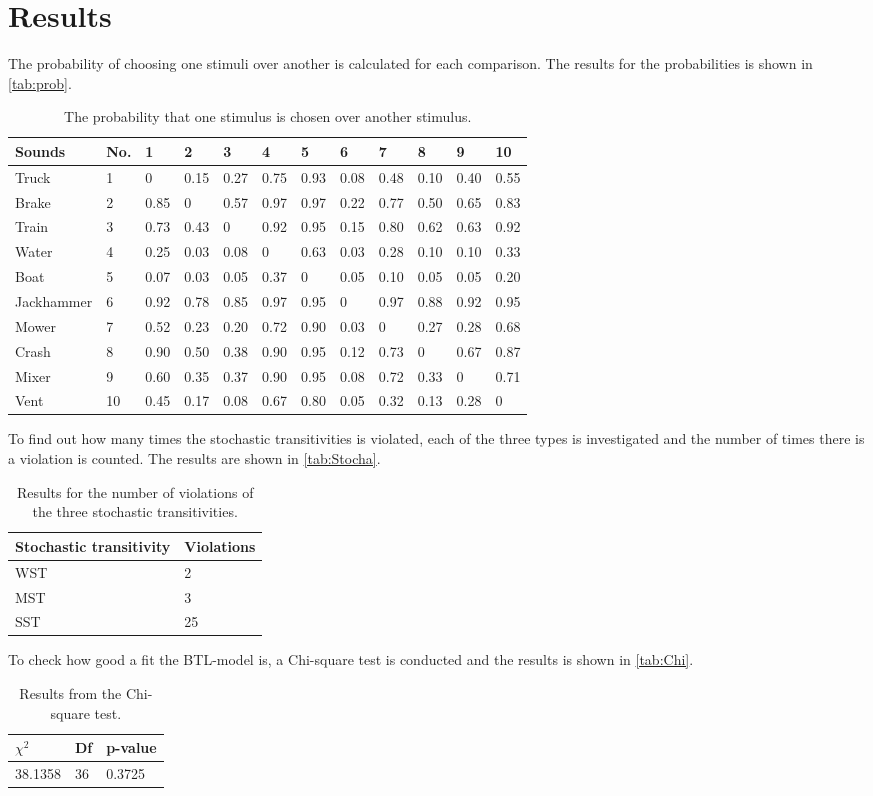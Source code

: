 \section*{Results}
\label{results}
%
The probability of choosing one stimuli over another is calculated for each comparison. The results for the probabilities is shown in \autoref{tab:prob}. 
%
\begin{table}[H]
\centering
\begin{tabular}{@{}llllllllllll@{}}
\toprule
Sounds     & No. & 1    & 2    & 3    & 4    & 5    & 6    & 7    & 8    & 9    & 10 \\ \midrule
Truck      & 1   & 0    & 0.15 & 0.27 & 0.75 & 0.93 & 0.08 & 0.48 & 0.10 & 0.40 & 0.55 \\
Brake      & 2   & 0.85 & 0    & 0.57 & 0.97 & 0.97 & 0.22 & 0.77 & 0.50 & 0.65 & 0.83 \\
Train      & 3   & 0.73 & 0.43 & 0    & 0.92 & 0.95 & 0.15 & 0.80 & 0.62 & 0.63 & 0.92 \\
Water      & 4   & 0.25 & 0.03 & 0.08 & 0    & 0.63 & 0.03 & 0.28 & 0.10 & 0.10 & 0.33 \\
Boat       & 5   & 0.07 & 0.03 & 0.05 & 0.37 & 0    & 0.05 & 0.10 & 0.05 & 0.05 & 0.20 \\
Jackhammer & 6   & 0.92 & 0.78 & 0.85 & 0.97 & 0.95 & 0    & 0.97 & 0.88 & 0.92 & 0.95 \\
Mower      & 7   & 0.52 & 0.23 & 0.20 & 0.72 & 0.90 & 0.03 & 0    & 0.27 & 0.28 & 0.68 \\
Crash      & 8   & 0.90 & 0.50 & 0.38 & 0.90 & 0.95 & 0.12 & 0.73 & 0    & 0.67 & 0.87 \\
Mixer      & 9   & 0.60 & 0.35 & 0.37 & 0.90 & 0.95 & 0.08 & 0.72 & 0.33 & 0    & 0.71 \\
Vent       & 10  & 0.45 & 0.17 & 0.08 & 0.67 & 0.80 & 0.05 & 0.32 & 0.13 & 0.28 & 0  \\ \bottomrule
\end{tabular}
\caption{The probability that one stimulus is chosen over another stimulus.}
\label{tab:prob}
\end{table} 
\noindent 
%
To find out how many times the stochastic transitivities is violated, each of the three types is investigated and the number of times there is a violation is counted. The results are shown in \autoref{tab:Stocha}. 
%
\begin{table}[H]
\centering
\begin{tabular}{@{}ll@{}}
\toprule
Stochastic transitivity     & Violations \\ \midrule
WST      & 2   \\
MST      & 3   \\
SST      & 25   \\ \bottomrule
\end{tabular}
\caption{Results for the number of violations of the three stochastic transitivities.}
\label{tab:Stocha}
\end{table} 
\noindent 
%
To check how good a fit the BTL-model is, a Chi-square test is conducted and the results is shown in \autoref{tab:Chi}. 

\begin{table}[H]
\centering
\begin{tabular}{@{}lll@{}}
\toprule
$\chi^{2}$     & Df & p-value \\ \midrule
38.1358      & 36  &  0.3725   \\ \bottomrule
\end{tabular}
\caption{Results from the Chi-square test.}
\label{tab:Chi}
\end{table} 

